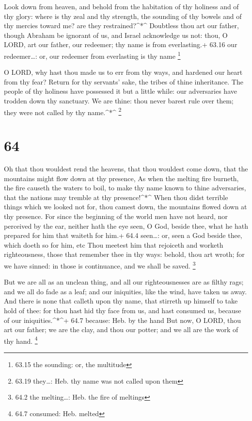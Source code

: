  Look down from heaven, and behold from the habitation of
thy holiness and of thy glory: where is thy zeal and thy strength, the
sounding of thy bowels and of thy mercies toward me? are they
restrained?\^{}*\^{}  Doubtless thou art our father, though
Abraham be ignorant of us, and Israel acknowledge us not: thou, O LORD,
art our father, our redeemer; thy name is from everlasting.+ 63.16 our
redeemer\ldots: or, our redeemer from everlasting is thy name
\footnote{63.15 the sounding: or, the multitude}

 O LORD, why hast thou made us to err from thy ways, and
hardened our heart from thy fear? Return for thy servants' sake, the
tribes of thine inheritance.  The people of thy holiness
have possessed it but a little while: our adversaries have trodden down
thy sanctuary.  We are thine: thou never barest rule over
them; they were not called by thy name.\^{}*\^{} \footnote{63.19
  they\ldots: Heb. thy name was not called upon them}

\hypertarget{section-63}{%
\section{64}\label{section-63}}

 Oh that thou wouldest rend the heavens, that thou wouldest
come down, that the mountains might flow down at thy presence,
 As when the melting fire burneth, the fire causeth the
waters to boil, to make thy name known to thine adversaries, that the
nations may tremble at thy presence!\^{}*\^{}  When thou
didst terrible things which we looked not for, thou camest down, the
mountains flowed down at thy presence.  For since the
beginning of the world men have not heard, nor perceived by the ear,
neither hath the eye seen, O God, beside thee, what he hath prepared for
him that waiteth for him.+ 64.4 seen\ldots: or, seen a God beside thee,
which doeth so for him, etc  Thou meetest him that rejoiceth
and worketh righteousness, those that remember thee in thy ways: behold,
thou art wroth; for we have sinned: in those is continuance, and we
shall be saved. \footnote{64.2 the melting\ldots: Heb. the fire of
  meltings}

 But we are all as an unclean thing, and all our
righteousnesses are as filthy rags; and we all do fade as a leaf; and
our iniquities, like the wind, have taken us away.  And
there is none that calleth upon thy name, that stirreth up himself to
take hold of thee: for thou hast hid thy face from us, and hast consumed
us, because of our iniquities.\^{}*\^{}+ 64.7 because: Heb. by the hand
 But now, O LORD, thou art our father; we are the clay, and
thou our potter; and we all are the work of thy hand. \footnote{64.7
  consumed: Heb. melted}

